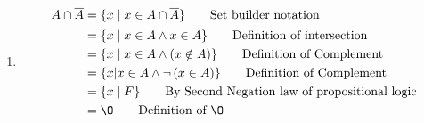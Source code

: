 \documentclass[12pt letter]{report}
\begin{document}
{\begin{enumerate}
\begin{align*}
			                          & = \{x  \mid x \in A \vee  x \notin A\} \tag*{Definition of Complement}                     \\
			                          & = \{x  \mid x  \in A \vee  \neg \left( x \in A \right)  \} \tag*{Definition of Complement} \\
			                          & = \{x  \mid T\} \tag*{By First Negation Law for propositional logic}                       \\
			                          & = U \tag*{Definition of Universal set}                                                     \\
		      \end{align*}
		\item
		      \begin{align*}
			      A \cap \overline{A} & = \{ x  \mid x \in A \cap \overline{A}\} \tag*{Set builder notation}                     \\
			                          & = \{x  \mid x \in A \wedge x \in \overline{A} \} \tag*{Definition of intersection}       \\
			                          & = \{x  \mid x \in A \wedge \left( x \notin A \right)  \} \tag*{Definition of Complement} \\
			                          & = \{x | x \in A \wedge  \neg \left( x \in  A \right) \} \tag*{Definition of
			      Complement}                                                                                                    \\
			                          & = \{x  \mid F\} \tag*{By Second Negation law of propositional logic}                     \\
			                          & = \O \tag*{Definition of $\O$}                                                           \\
		      \end{align*}
	\end{enumerate}
}

\end{document}
